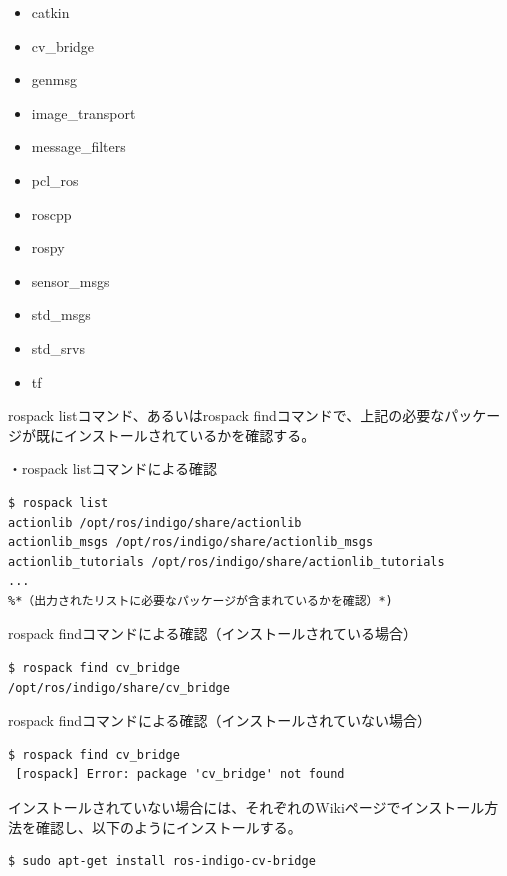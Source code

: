 \vspace{\baselineskip}
\begin{itemize}
\item catkin
\item cv\_bridge
\item genmsg
\item image\_transport
\item message\_filters
\item pcl\_ros
\item roscpp
\item rospy
\item sensor\_msgs
\item std\_msgs
\item std\_srvs
\item tf
\end{itemize}
\vspace{\baselineskip}

rospack listコマンド、あるいはrospack findコマンドで、上記の必要なパッケージが既にインストールされているかを確認する。
\vspace{\baselineskip}

・rospack listコマンドによる確認
\begin{lstlisting}[language=ROS]
$ rospack list
actionlib /opt/ros/indigo/share/actionlib
actionlib_msgs /opt/ros/indigo/share/actionlib_msgs
actionlib_tutorials /opt/ros/indigo/share/actionlib_tutorials
...
%*（出力されたリストに必要なパッケージが含まれているかを確認）*)
\end{lstlisting}

rospack findコマンドによる確認（インストールされている場合）

\begin{lstlisting}[language=ROS]
$ rospack find cv_bridge
/opt/ros/indigo/share/cv_bridge
\end{lstlisting}

rospack findコマンドによる確認（インストールされていない場合）

\begin{lstlisting}[language=ROS]
$ rospack find cv_bridge
 [rospack] Error: package 'cv_bridge' not found
\end{lstlisting}

インストールされていない場合には、それぞれのWikiページでインストール方法を確認し、以下のようにインストールする。

\begin{lstlisting}[language=ROS]
$ sudo apt-get install ros-indigo-cv-bridge
\end{lstlisting}

